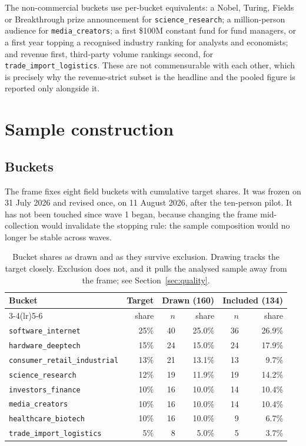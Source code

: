 \documentclass[11pt]{article}
\begin{document}
The non-commercial buckets use per-bucket equivalents: a Nobel, Turing, Fields
or Breakthrough prize announcement for \texttt{science\_research}; a
million-person audience for \texttt{media\_creators}; a first \$100M constant
fund for fund managers, or a first year topping a recognised industry ranking
for analysts and economists; and revenue first, third-party volume rankings
second, for \texttt{trade\_import\_logistics}. These are not commensurable with
each other, which is precisely why the revenue-strict subset is the headline
and the pooled figure is reported only alongside it.

\section{Sample construction}

\subsection{Buckets}

The frame fixes eight field buckets with cumulative target shares. It was
frozen on 31 July 2026 and revised once, on 11 August 2026, after the
ten-person pilot. It has not been touched since wave 1 began, because changing
the frame mid-collection would invalidate the stopping rule: the sample
composition would no longer be stable across waves.

\begin{table}[h]
\centering
\begin{tabular}{lrrrrr}
\toprule
Bucket & Target & \multicolumn{2}{c}{Drawn (160)} & \multicolumn{2}{c}{Included (134)} \\
\cmidrule(lr){3-4}\cmidrule(lr){5-6}
 & share & $n$ & share & $n$ & share \\
\midrule
\texttt{software\_internet}           & 25\% & 40 & 25.0\% & 36 & 26.9\% \\
\texttt{hardware\_deeptech}           & 15\% & 24 & 15.0\% & 24 & 17.9\% \\
\texttt{consumer\_retail\_industrial} & 13\% & 21 & 13.1\% & 13 & 9.7\% \\
\texttt{science\_research}            & 12\% & 19 & 11.9\% & 19 & 14.2\% \\
\texttt{investors\_finance}           & 10\% & 16 & 10.0\% & 14 & 10.4\% \\
\texttt{media\_creators}              & 10\% & 16 & 10.0\% & 14 & 10.4\% \\
\texttt{healthcare\_biotech}          & 10\% & 16 & 10.0\% & 9  & 6.7\% \\
\texttt{trade\_import\_logistics}     & 5\%  & 8  & 5.0\%  & 5  & 3.7\% \\
\bottomrule
\end{tabular}
\caption{Bucket shares as drawn and as they survive exclusion. Drawing tracks
the target closely. Exclusion does not, and it pulls the analysed sample away
from the frame; see Section~\ref{sec:quality}.}
\end{table}
\end{document}
